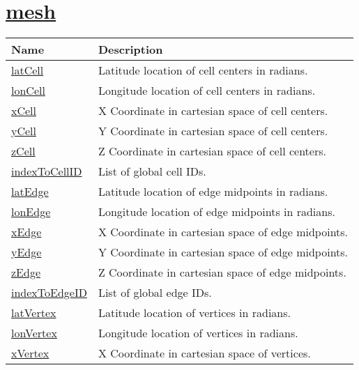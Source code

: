 \section[mesh]{\hyperref[sec:var_sec_mesh]{mesh}}
\label{sec:var_tab_mesh}
{\small
\begin{center}
\begin{longtable}{| p{2.0in} | p{4.0in} |}
	\hline
	{\bf Name} & {\bf Description} \\
	\hline
	\hyperref[subsec:var_sec_mesh_latCell]{latCell} & Latitude location of cell centers in radians. \\
	\hline
	\hyperref[subsec:var_sec_mesh_lonCell]{lonCell} & Longitude location of cell centers in radians. \\
	\hline
	\hyperref[subsec:var_sec_mesh_xCell]{xCell} & X Coordinate in cartesian space of cell centers. \\
	\hline
	\hyperref[subsec:var_sec_mesh_yCell]{yCell} & Y Coordinate in cartesian space of cell centers. \\
	\hline
	\hyperref[subsec:var_sec_mesh_zCell]{zCell} & Z Coordinate in cartesian space of cell centers. \\
	\hline
	\hyperref[subsec:var_sec_mesh_indexToCellID]{indexToCellID} & List of global cell IDs. \\
	\hline
	\hyperref[subsec:var_sec_mesh_latEdge]{latEdge} & Latitude location of edge midpoints in radians. \\
	\hline
	\hyperref[subsec:var_sec_mesh_lonEdge]{lonEdge} & Longitude location of edge midpoints in radians. \\
	\hline
	\hyperref[subsec:var_sec_mesh_xEdge]{xEdge} & X Coordinate in cartesian space of edge midpoints. \\
	\hline
	\hyperref[subsec:var_sec_mesh_yEdge]{yEdge} & Y Coordinate in cartesian space of edge midpoints. \\
	\hline
	\hyperref[subsec:var_sec_mesh_zEdge]{zEdge} & Z Coordinate in cartesian space of edge midpoints. \\
	\hline
	\hyperref[subsec:var_sec_mesh_indexToEdgeID]{indexToEdgeID} & List of global edge IDs. \\
	\hline
	\hyperref[subsec:var_sec_mesh_latVertex]{latVertex} & Latitude location of vertices in radians. \\
	\hline
	\hyperref[subsec:var_sec_mesh_lonVertex]{lonVertex} & Longitude location of vertices in radians. \\
	\hline
	\hyperref[subsec:var_sec_mesh_xVertex]{xVertex} & X Coordinate in cartesian space of vertices. \\

\end{longtable}
\end{center}}
